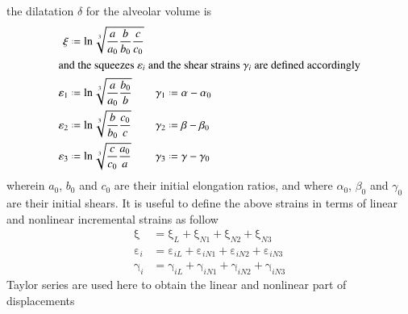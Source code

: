 the dilatation $\delta$ for the alveolar volume is 
\begin{subequations}
	\begin{align}
	\mathrm  \xi & \defeq \ln \sqrt[3]{\frac{a}{a_0}
		\frac{b}{b_0} \frac{c}{c_0}} \\
	\intertext{and the squeezes $\varepsilon_i$ and the shear strains $\gamma_i$ are defined accordingly}
	\varepsilon_1 & \defeq \ln \sqrt[3]{\frac{a}
		{a_0} \frac{b_0}{b}} & 	\gamma_1 & \defeq \alpha - \alpha_0 \\
	\varepsilon_2 & \defeq \ln \sqrt[3]{\frac{b}
		{b_0} \frac{c_0}{c}} & \gamma_2 & \defeq \beta - \beta_0 \\
	\varepsilon_3 & \defeq \ln \sqrt[3]{\frac{c}
		{c_0} \frac{a_0}{a}} & 	\gamma_3 & \defeq \gamma - \gamma_0 
	\end{align}
\end{subequations}
wherein $a_0$, $b_0$ and $c_0$ are their initial elongation ratios, and where $\alpha_0$, $\beta_0$ and $\gamma_0$ are their initial shears.
It is useful to define the above strains in terms of linear and nonlinear incremental strains as follow
\begin{subequations}
	\begin{align}
	\mathrm  \xi & = \mathrm \xi_{L} + \mathrm  \xi_{N1} + \mathrm  \xi_{N2} + \mathrm  \xi_{N3}\\
	\mathrm  \varepsilon_{i} & = \mathrm  \varepsilon_{iL} + \mathrm  \varepsilon_{iN1} + \mathrm  \varepsilon_{iN2} + \mathrm  \varepsilon_{iN3} \\
	\mathrm \gamma_{i} & = \mathrm  \gamma_{iL} + \mathrm  \gamma_{iN1} + \mathrm  \gamma_{iN2} + \mathrm  \gamma_{iN3}
	\end{align}
	\label{totalvirtualstrain}
\end{subequations}
Taylor series are used here to obtain the linear and nonlinear part of displacements 
